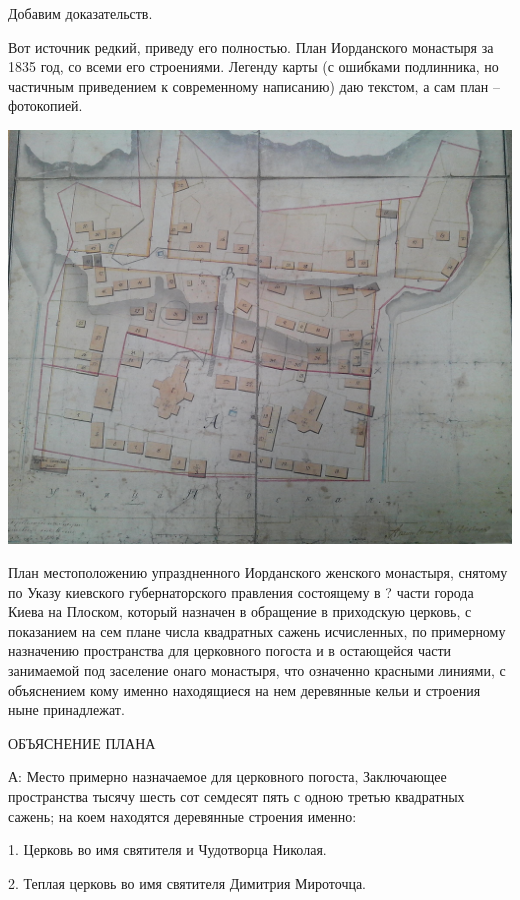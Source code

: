 Добавим доказательств.

Вот источник редкий, приведу его полностью. План Иорданского монастыря за 1835 год, со всеми его строениями. Легенду карты (с ошибками подлинника, но частичным приведением к современному написанию) даю текстом, а сам план – фотокопией.

\begin{center}
\includegraphics[width=\linewidth]{chast-kirvys/iordanruch/IMG_20170627_142118.jpg}
\end{center}

План местоположению упраздненного Иорданского женского монастыря, снятому по Указу киевского губернаторского правления состоящему в ? части города Киева на Плоском, который назначен в обращение в приходскую церковь, с показанием на сем плане числа квадратных сажень исчисленных, по примерному назначению пространства для церковного погоста и в остающейся части занимаемой под заселение онаго монастыря, что означенно красными линиями, с объяснением кому именно находящиеся на нем деревянные кельи и строения ныне принадлежат.

ОБЪЯСНЕНИЕ ПЛАНА

А: Место примерно назначаемое для церковного погоста, Заключающее пространства тысячу шесть сот семдесят пять с одною третью квадратных сажень; на коем находятся деревянные строения именно:

1. Церковь во имя святителя и Чудотворца Николая.

2. Теплая церковь во имя святителя Димитрия Мироточца.

